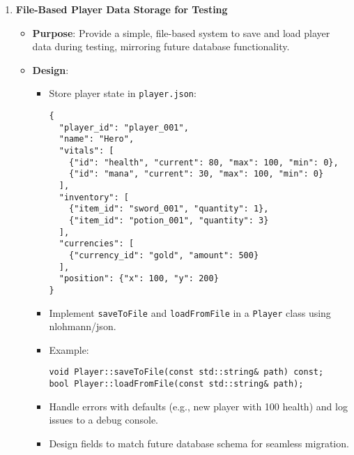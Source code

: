 \begin{enumerate}
    \item \textbf{File-Based Player Data Storage for Testing}
        \begin{itemize}
            \item \textbf{Purpose}: Provide a simple, file-based system to save and load player data during testing, mirroring future database functionality.
            \item \textbf{Design}:
                \begin{itemize}
                    \item Store player state in \texttt{player.json}:
                    \begin{lstlisting}[style=htmlstyle]
{
  "player_id": "player_001",
  "name": "Hero",
  "vitals": [
    {"id": "health", "current": 80, "max": 100, "min": 0},
    {"id": "mana", "current": 30, "max": 100, "min": 0}
  ],
  "inventory": [
    {"item_id": "sword_001", "quantity": 1},
    {"item_id": "potion_001", "quantity": 3}
  ],
  "currencies": [
    {"currency_id": "gold", "amount": 500}
  ],
  "position": {"x": 100, "y": 200}
}
                    \end{lstlisting}
                    \item Implement \texttt{saveToFile} and \texttt{loadFromFile} in a \texttt{Player} class using nlohmann/json.
                    \item Example:
                    \begin{lstlisting}[style=htmlstyle]
void Player::saveToFile(const std::string& path) const;
bool Player::loadFromFile(const std::string& path);
                    \end{lstlisting}
                    \item Handle errors with defaults (e.g., new player with 100 health) and log issues to a debug console.
                    \item Design fields to match future database schema for seamless migration.
                \end{itemize}
        \end{itemize}
\end{enumerate}






